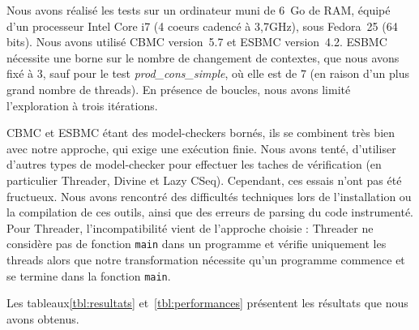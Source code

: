 Nous avons réalisé les tests sur un ordinateur muni de 6~Go de RAM, équipé d'un
processeur Intel Core i7 (4 coeurs cadencé à 3,7GHz), sous Fedora~25 (64 bits).
Nous avons utilisé CBMC\cite{CBMC} version~5.7 et ESBMC\cite{ESBMC} version~4.2.
ESBMC nécessite une borne sur le nombre de changement de contextes, que nous
avons fixé à 3, sauf pour le test \emph{prod\_cons\_simple}, où elle est de 7
(en raison d'un plus grand nombre de threads). En présence de boucles, nous
avons limité l'exploration à trois itérations.

CBMC et ESBMC étant des model-checkers bornés, ils se combinent très bien avec
notre approche, qui exige une exécution finie. Nous avons tenté, d'utiliser
d'autres types de model-checker pour effectuer les taches de vérification (en
particulier Threader, Divine et Lazy CSeq). Cependant, ces essais n'ont pas été
fructueux. Nous avons rencontré des difficultés techniques lors de
l'installation ou la compilation de ces outils, ainsi que des erreurs de parsing
du code instrumenté. Pour Threader, l'incompatibilité vient de l'approche
choisie : Threader ne considère pas de fonction \texttt{main} dans un programme
et vérifie uniquement les threads alors que notre transformation nécessite qu'un
programme commence et se termine dans la fonction \texttt{main}.

Les tableaux\ref{tbl:resultats} et~\ref{tbl:performances} présentent les
résultats que nous avons obtenus.

